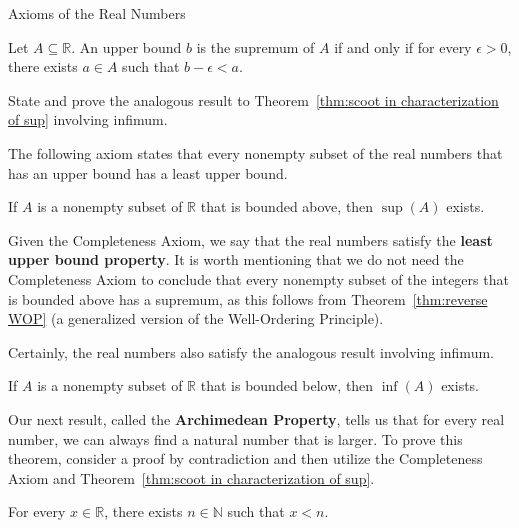 \begin{section}{Axioms of the Real Numbers}
\begin{theorem}\label{thm:scoot in characterization of sup}
Let $A\subseteq \mathbb{R}$. An upper bound $b$ is the supremum of $A$ if and only if for every $\epsilon >0$, there exists $a\in A$ such that $b-\epsilon <a$.
\end{theorem}

\begin{problem}
State and prove the analogous result to Theorem~\ref{thm:scoot in characterization of sup} involving infimum.
\end{problem}

The following axiom states that every nonempty subset of the real numbers that has an upper bound has a least upper bound.

\begin{axiom}\label{axiom:completeness}
If $A$ is a nonempty subset of $\mathbb{R}$ that is bounded above, then $\sup(A)$ exists.
\end{axiom}

Given the Completeness Axiom, we say that the real numbers satisfy the \textbf{least upper bound property}. It is worth mentioning that we do not need the Completeness Axiom to conclude that every nonempty subset of the integers that is bounded above has a supremum, as this follows from Theorem~\ref{thm:reverse WOP} (a generalized version of the Well-Ordering Principle). 

Certainly, the real numbers also satisfy the analogous result involving infimum.

\begin{theorem}
If $A$ is a nonempty subset of $\mathbb{R}$ that is bounded below, then $\inf(A)$ exists.
\end{theorem}

Our next result, called the \textbf{Archimedean Property}, tells us that for every real number, we can always find a natural number that is larger. To prove this theorem, consider a proof by contradiction and then utilize the Completeness Axiom and Theorem~\ref{thm:scoot in characterization of sup}.

\begin{theorem}
For every $x\in\mathbb{R}$, there exists $n\in\mathbb{N}$ such that $x<n$.
\end{theorem}


\end{section}
